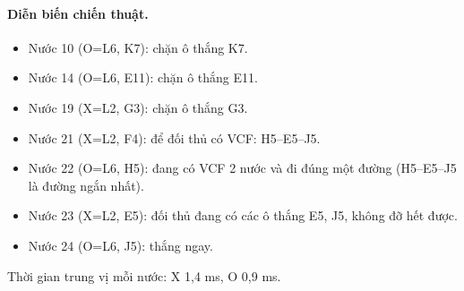 \paragraph{Diễn biến chiến thuật.}
\begin{itemize}\footnotesize\linespread{1.1}\selectfont
\setlength{\itemsep}{0pt}
  \item Nước 10 (O=L6, K7): chặn ô thắng K7.
  \item Nước 14 (O=L6, E11): chặn ô thắng E11.
  \item Nước 19 (X=L2, G3): chặn ô thắng G3.
  \item Nước 21 (X=L2, F4): để đối thủ có VCF: H5--E5--J5.
  \item Nước 22 (O=L6, H5): đang có VCF 2 nước và đi đúng một đường (H5--E5--J5 là đường ngắn nhất).
  \item Nước 23 (X=L2, E5): đối thủ đang có các ô thắng E5, J5, không đỡ hết được.
  \item Nước 24 (O=L6, J5): thắng ngay.
\end{itemize}
Thời gian trung vị mỗi nước: X 1,4 ms, O 0,9 ms.
\clearpage

